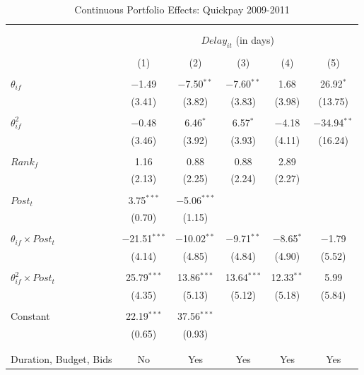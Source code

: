 \documentclass[]{article}
\begin{document}
\begin{table}[H] \centering 
  \caption{Continuous Portfolio Effects: Quickpay 2009-2011} 
  \label{} 
\small 
\begin{tabular}{@{\extracolsep{-2pt}}lccccc} 
\\[-1.8ex]\hline 
\hline \\[-1.8ex] 
\\[-1.8ex] & \multicolumn{5}{c}{$Delay_{it}$ (in days)} \\ 
\\[-1.8ex] & (1) & (2) & (3) & (4) & (5)\\ 
\hline \\[-1.8ex] 
 $\theta_{if}$ & $-$1.49 & $-$7.50$^{**}$ & $-$7.60$^{**}$ & 1.68 & 26.92$^{*}$ \\ 
  & (3.41) & (3.82) & (3.83) & (3.98) & (13.75) \\ 
  & & & & & \\ 
 $\theta_{if}^2$ & $-$0.48 & 6.46$^{*}$ & 6.57$^{*}$ & $-$4.18 & $-$34.94$^{**}$ \\ 
  & (3.46) & (3.92) & (3.93) & (4.11) & (16.24) \\ 
  & & & & & \\ 
 $Rank_f$ & 1.16 & 0.88 & 0.88 & 2.89 &  \\ 
  & (2.13) & (2.25) & (2.24) & (2.27) &  \\ 
  & & & & & \\ 
 $Post_t$ & 3.75$^{***}$ & $-$5.06$^{***}$ &  &  &  \\ 
  & (0.70) & (1.15) &  &  &  \\ 
  & & & & & \\ 
 $\theta_{if} \times Post_t$ & $-$21.51$^{***}$ & $-$10.02$^{**}$ & $-$9.71$^{**}$ & $-$8.65$^{*}$ & $-$1.79 \\ 
  & (4.14) & (4.85) & (4.84) & (4.90) & (5.52) \\ 
  & & & & & \\ 
 $\theta_{if}^2 \times Post_t$ & 25.79$^{***}$ & 13.86$^{***}$ & 13.64$^{***}$ & 12.33$^{**}$ & 5.99 \\ 
  & (4.35) & (5.13) & (5.12) & (5.18) & (5.84) \\ 
  & & & & & \\ 
 Constant & 22.19$^{***}$ & 37.56$^{***}$ &  &  &  \\ 
  & (0.65) & (0.93) &  &  &  \\ 
  & & & & & \\ 
\hline \\[-1.8ex] 
Duration, Budget, Bids & No & Yes & Yes & Yes & Yes \\ 

\end{tabular}
\end{table}
\end{document}
